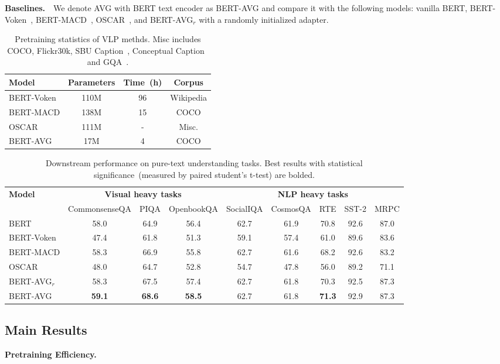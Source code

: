 \textbf{Baselines.}~~We denote AVG with BERT text encoder as BERT-AVG and compare it with the following models: vanilla BERT, BERT-Voken~\citep{voken}, BERT-MACD~\citep{macd}, OSCAR~\citep{oscar}, and BERT-AVG$_r$ with a randomly initialized adapter.
\begin{table}[t!]
	\centering
	\small
	\begin{tabular}{l|ccc}
		\toprule
		\textbf{Model} & Parameters & Time~(h) & Corpus  \\
		\midrule
		BERT-Voken & 110M & 96   & Wikipedia \\
		BERT-MACD & 138M & 15   & COCO\\
		OSCAR & 111M &  - & Misc.\\
		\midrule
		BERT-AVG & 17M & 4 & COCO\\
		\bottomrule
	\end{tabular}
	\caption{Pretraining statistics of VLP methds. Misc includes COCO, Flickr30k, SBU Caption~\citep{sbu}, Conceptual Caption~\citep{cc} and GQA~\citep{gqa}.}
	\label{table:stats}
\end{table}
\begin{table}[t!]
	\centering
	\footnotesize
	\begin{tabular}{l|ccc|ccccc}
		\toprule
		\multirow{2}{*}{\textbf{Model}} & \multicolumn{3}{c|}{\textbf{Visual heavy tasks}} & \multicolumn{5}{c}{\textbf{NLP heavy tasks}}
		 \\
		&CommonsenseQA &PIQA &OpenbookQA &SocialIQA &CosmosQA &RTE &SST-2 &MRPC \\
		\midrule
		BERT &58.0 &64.9 &56.4 &62.7 &61.9 &70.8 &92.6 &87.0 \\
		BERT-Voken &47.4 &61.8 &51.3 &59.1 &57.4 &61.0 &89.6 &83.6 \\
		BERT-MACD &58.3 &66.9 &55.8 &62.7 &61.6 &68.2 &92.6 &83.2 \\
		OSCAR &48.0 &64.7 &52.8 &54.7 &47.8 &56.0 &89.2 &71.1 \\
		\midrule
		BERT-AVG$_r$ &58.3 &67.5 &57.4 &62.7 &61.8 &70.3 &92.5 &87.3 \\
		BERT-AVG &\textbf{59.1} &\textbf{68.6} &\textbf{58.5} &62.7 &61.8 &\textbf{71.3} &92.9 &87.3 \\
		\bottomrule
	\end{tabular}
	\caption{Downstream performance on pure-text understanding tasks. Best results with statistical significance~(measured by paired student's t-test) are bolded.}
	\label{table:main}
\end{table}
\subsection{Main Results}
\label{sec:main}
\textbf{Pretraining Efficiency.}



